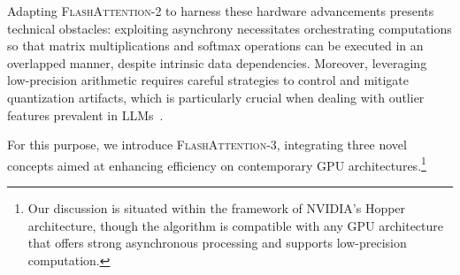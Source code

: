 Adapting \textsc{FlashAttention-2} to harness these hardware advancements presents technical obstacles: exploiting asynchrony necessitates orchestrating computations so that matrix multiplications and softmax operations can be executed in an overlapped manner, despite intrinsic data dependencies. Moreover, leveraging low-precision arithmetic requires careful strategies to control and mitigate quantization artifacts, which is particularly crucial when dealing with outlier features prevalent in LLMs~\citep{dettmers2208llm, sun2024massive}.

For this purpose, we introduce \textsc{FlashAttention-3}, integrating three novel concepts aimed at enhancing efficiency on contemporary GPU architectures.\footnote{Our discussion is situated within the framework of NVIDIA's Hopper architecture, though the algorithm is compatible with any GPU architecture that offers strong asynchronous processing and supports low-precision computation.}

